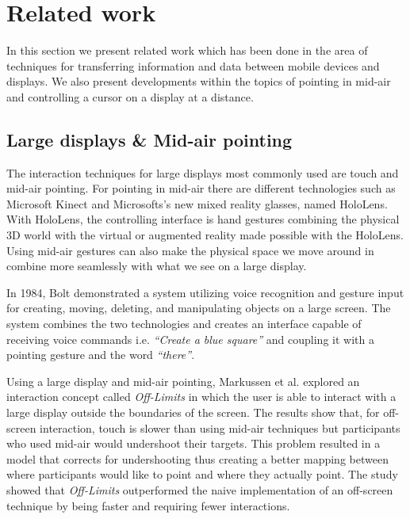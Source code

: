 \section{Related work} \label{sec:relatedwork}
In this section we present related work which has been done in the area of techniques for transferring information and data between mobile devices and displays.
We also present developments within the topics of pointing in mid-air and controlling a cursor on a display at a distance.

\subsection{Large displays \& Mid-air pointing} \label{sec:largeDisplayAirPointing}
The interaction techniques for large displays most commonly used are touch and mid-air pointing.
For pointing in mid-air there are different technologies such as Microsoft Kinect and Microsofts's new mixed reality glasses, named HoloLens.
With HoloLens, the controlling interface is hand gestures combining the physical 3D world with the virtual or augmented reality made possible with the HoloLens.
Using mid-air gestures can also make the physical space we move around in combine more seamlessly with what we see on a large display.

In 1984, Bolt \cite{Bolt:1980} demonstrated a system utilizing voice recognition and gesture input for creating, moving, deleting, and  manipulating objects on a large screen.
The system combines the two technologies and creates an interface capable of receiving voice commands i.e. \textit{``Create a blue square''}  and coupling it with a pointing gesture and the word \textit{``there''}.

Using a large display and mid-air pointing, Markussen et al. \cite{Markussen:2016} explored an interaction concept called \emph{Off-Limits} in which the user is able to interact with a large display outside the boundaries of the screen.
The results show that, for off-screen interaction, touch is slower than using mid-air techniques but participants who used mid-air would undershoot their targets.
This problem resulted in a model that corrects for undershooting thus creating a better mapping between where participants would like to point and where they actually point.
The study showed that \emph{Off-Limits} outperformed the naive implementation of an off-screen technique by being faster and requiring fewer interactions.


